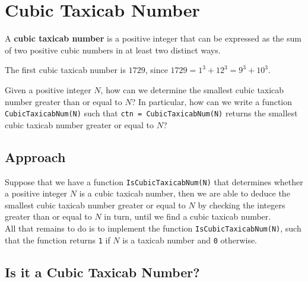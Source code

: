 \section{Cubic Taxicab Number}
\begin{definition}
	A \textbf{cubic taxicab number} is a positive integer that can be expressed as the sum of two positive cubic numbers in at least two distinct ways.
\end{definition}

\begin{example}
	The first cubic taxicab number is $1729$, since $1729 = 1^3 + 12^3 = 9^3 + 10^3$.
\end{example}

\begin{problem}
	Given a positive integer $N$, how can we determine the smallest cubic taxicab number greater than or equal to $N$? In particular, how can we write a function \lstinline|CubicTaxicabNum(N)| such that \lstinline|ctn = CubicTaxicabNum(N)| returns the smallest cubic taxicab number greater or equal to $N$?
\end{problem}


\subsection{Approach}
Suppose that we have a function \lstinline|IsCubicTaxicabNum(N)| that determines whether a positive integer $N$ is a cubic taxicab number, then we are able to deduce the smallest cubic taxicab number greater or equal to $N$ by checking the integers greater than or equal to $N$ in turn, until we find a cubic taxicab number.\\



\noindent
All that remains to do is to implement the function \lstinline|IsCubicTaxicabNum(N)|, such that the function returns \lstinline|1| if $N$ is a taxicab number and \lstinline|0| otherwise.

\newpage
\subsection{Is it a Cubic Taxicab Number?}

